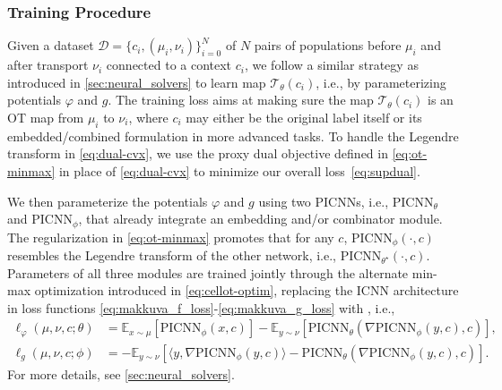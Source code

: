 \subsubsection{Training Procedure}

 Given a dataset $\mathcal{D}=\{c_i, (\mu_i, \nu_i) \}_{i=0}^N$ of $N$ pairs of populations before $\mu_i$ and after transport $\nu_i$ connected to a context $c_i$, we follow a similar strategy as introduced in \cref{sec:neural_solvers} to learn map $\mathcal{T}_\theta(c_i)$, i.e., by parameterizing potentials $\varphi$ and $g$. 
The training loss aims at making sure the map $\mathcal{T}_\theta(c_i)$ is an OT map from $\mu_i$ to $\nu_i$, where $c_i$ may either be the original label itself or its embedded/combined formulation in more advanced tasks. To handle the Legendre transform in \eqref{eq:dual-cvx}, we use the proxy dual objective defined in \eqref{eq:ot-minmax} \citep{makkuva2020optimal} in place of \eqref{eq:dual-cvx} to minimize our overall loss~\eqref{eq:supdual}.

We then parameterize the potentials $\varphi$ and $g$ using two PICNNs, i.e., $\text{PICNN}_{\theta}$ and $\text{PICNN}_{\phi}$, that already integrate an embedding and/or combinator module. The regularization in \eqref{eq:ot-minmax} promotes that for any $c$, $\text{PICNN}_{\phi}(\cdot,c)$ resembles the Legendre transform of the other network, i.e., $\text{PICNN}_{\theta^\star}(\cdot,c)$.
Parameters of all three modules are trained jointly through the alternate min-max optimization introduced in \eqref{eq:cellot-optim}, replacing the \acrshort{ICNN} architecture in loss functions \eqref{eq:makkuva_f_loss}-\eqref{eq:makkuva_g_loss} with , i.e.,
\begin{align*} 
    \ell_\varphi(\mu, \nu, c; \theta) &= \mathbb{E}_{x \sim \mu}[\text{PICNN}_{\phi}(x, c)] - \mathbb{E}_{y \sim \nu}[\text{PICNN}_{\theta}(\nabla \text{PICNN}_{\phi}(y, c), c)], \\
    \ell_g(\mu, \nu, c; \phi) &= -\mathbb{E}_{y \sim \nu}[\langle y, \nabla \text{PICNN}_{\phi}(y, c)\rangle-\text{PICNN}_{\theta}(\nabla \text{PICNN}_{\phi}(y, c), c)].
\end{align*}
For more details, see \cref{sec:neural_solvers}.

